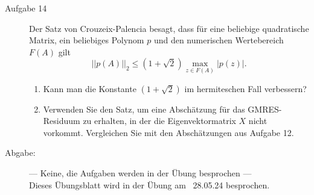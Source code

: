 \documentclass[a4paper,11pt]{scrartcl}
\begin{document}
\begin{description}
 \item[Aufgabe 14] Der Satz von Crouzeix-Palencia besagt, dass für eine beliebige quadratische Matrix, ein beliebiges Polynom $p$ und den numerischen Wertebereich $F(A)$ gilt
 \begin{equation*}
 ||p(A)||_2 \leq (1+\sqrt{2}) \max_{z\in F(A)} |p(z)| .
 \end{equation*}
 \begin{enumerate}
 \item Kann man die Konstante $(1 + \sqrt{2})$ im hermiteschen Fall verbessern?
 \item Verwenden Sie den Satz, um eine Abschätzung für das GMRES-Residuum zu erhalten, in der die Eigenvektormatrix $X$ nicht vorkommt. Vergleichen Sie mit den Abschätzungen aus Aufgabe 12.
 \end{enumerate}
 
       
\end{description}


\begin{description}
\item[Abgabe:] --- Keine, die Aufgaben werden in der Übung besprochen ---\\
Dieses Übungsblatt wird in der Übung am ~28.05.24 besprochen.



\end{description}
\end{document}
